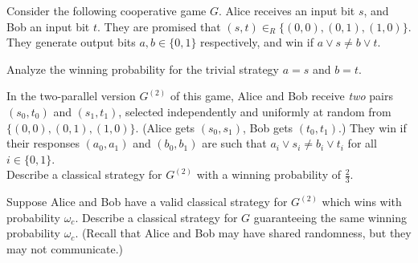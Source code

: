 \documentclass[a4paper,10pt,landscape,twocolumn]{scrartcl}
\begin{document}
\begin{exercise}
	Consider the following cooperative game $G$. Alice receives an input bit $s$, and Bob an input bit $t$. They are promised that $(s,t) \in_R \{(0,0),(0,1),(1,0)\}$. They generate output bits $a,b \in \{0,1\}$ respectively, and win if $a \vee s \neq b \vee t$.
	\begin{subex}
		Analyze the winning probability for the trivial strategy $a = s$ and $b = t$.
	\end{subex}
    \begin{subex}
    	In the two-parallel version $G^{(2)}$ of this game, Alice and Bob receive \emph{two} pairs $(s_0, t_0)$ and $(s_1, t_1)$, selected independently and uniformly at random from $\{(0,0),(0,1),(1,0)\}$. (Alice gets $(s_0, s_1)$, Bob gets $(t_0, t_1)$.) They win if their responses $(a_0, a_1)$ and $(b_0, b_1)$ are such that $a_i \vee s_i \neq b_i \vee t_i$ for all $i \in \{0,1\}$.
    	\\
    	Describe a classical strategy for $G^{(2)}$ with a winning probability of $\frac{2}{3}$.
    \end{subex}
    \begin{subex}
    	Suppose Alice and Bob have a valid classical strategy for $G^{(2)}$ which wins with probability $\omega_c$. Describe a classical strategy for $G$ guaranteeing the same winning probability $\omega_c$. (Recall that Alice and Bob may have shared randomness, but they may not communicate.)
    \end{subex}
\end{exercise}
\end{document}

